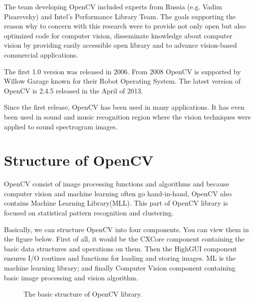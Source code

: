 The team developing OpenCV included experts from Russia (e.g. Vadim Pisarevsky) and Intel’s Performance Library Team.  
The goals supporting the reason why to concern with this research were to provide not only open but also optimized code for computer vision,
disseminate knowledge about computer vision by providing easily accessible open library and to advance vision-based commercial applications.

The first 1.0 version was released in 2006.
From 2008 OpenCV is supported by Willow Garage known for their Robot Operating System.
The latest version of OpenCV is 2.4.5 released in the April of 2013.

Since the first release, OpenCV has been used in many applications. 
It has even been used in sound and music recognition region where the vision techniques were applied to sound spectrogram images.

\section{Structure of OpenCV}
OpenCV consist of image processing functions and algorithms and because computer vision and machine learning often go hand-in-hand, 
OpenCV also contains Machine Learning Library(MLL).
This part of OpenCV library is focused on statistical pattern recognition and clustering. 

Basically, we can structure OpenCV into four components. You can view them in the figure below.
First of all, it would be the CXCore component containing the basic data structures and operations on them.
Then the HighGUI component ensures I/O routines and functions for loading and storing images.
ML is the machine learning library; and finally Computer Vision component containing basic image processing and vision algorithm.

\begin{figure}[h!]
    \caption{The basic structure of OpenCV library.}
\end{figure}

